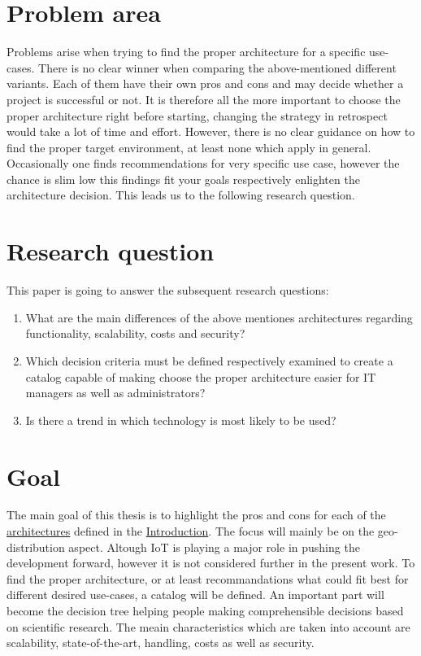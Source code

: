 \documentclass[MSC,Master,english]{twbook}%
\begin{document}
\section{Problem area}
Problems arise when trying to find the proper architecture for a specific use-cases. There is no clear winner when comparing the above-mentioned different variants. Each of them  have their own pros and cons and may decide whether a project is successful or not. It is therefore all the more important to choose the proper architecture right before starting, changing the strategy in retrospect would take a lot of time and effort. However, there is no clear guidance on how to find the proper target environment, at least none which apply in general. Occasionally one finds recommendations for very specific use case, however the chance is slim low this findings fit your goals respectively enlighten the architecture decision. This leads us to the following research question.

\section{Research question}
This paper is going to answer the subsequent research questions:
\begin{enumerate}
    \item What are the main differences of the above mentiones architectures regarding   functionality, scalability, costs and security?
    \item Which decision criteria must be defined respectively examined to create a catalog capable
    of making choose the proper architecture easier for \ac{IT} managers as well as administrators?
    \item Is there a trend in which technology is most likely to be used?
\end{enumerate}

\section{Goal}
The main goal of this thesis is to highlight the pros and cons for each of the \hyperref[item:architecture]{architectures} defined in the \hyperref[chap:introduction]{Introduction}. The focus will mainly be on the geo-distribution aspect. Altough \ac{IoT} is playing a major role in pushing the development forward, however it is not considered further in the present work. To find the proper architecture, or at least recommandations what could fit best for different desired use-cases, a catalog will be defined. An important part will become the decision tree helping people making comprehensible decisions based on scientific research. The meain characteristics which are taken into account are scalability, state-of-the-art, handling, costs as well as security.
\end{document}
